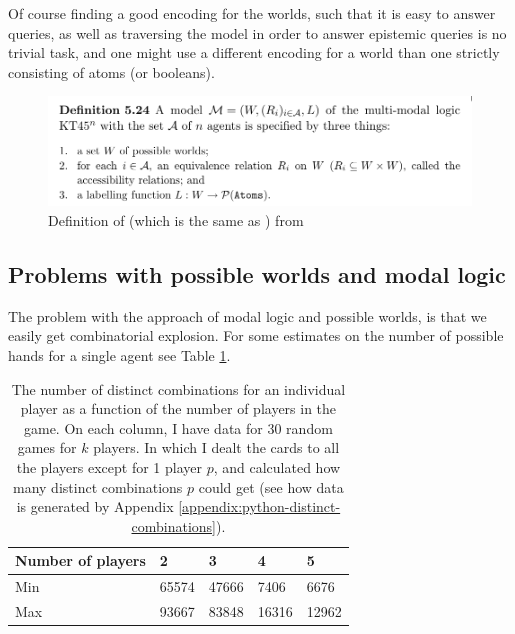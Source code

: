 Of course finding a good encoding for the worlds, such that it is easy to answer queries, as well as traversing the model in order to answer epistemic queries is no trivial task, and one might use a different encoding for a world than one strictly consisting of atoms (or booleans).






\begin{figure}
	\centering
\includegraphics[width=13cm,frame]{images/kt45n-definition.png}
	\caption{Definition of \KTfourfiveN (which is the same as \SfiveN{}) from \cite{HuthAndRyan2004KT45n}}
	\label{fig:kt45n-definition}
\end{figure}




\subsection{Problems with possible worlds and modal logic}
The problem with the approach of modal logic and possible worlds, is that we easily get combinatorial explosion. 
For some estimates on the number of possible hands for a single agent see Table \ref{table:combinations}.

\begin{table}
	\centering
\begin{tabular}{l|llll}
Number of players & 2       & 3       & 4       & 5      \\\hline
Min               & 65574   & 47666   & 7406    & 6676   \\
Max               & 93667   & 83848   & 16316   & 12962 
\end{tabular}
	\caption{The number of distinct combinations for an individual player as a function of the number of players in the game. On each column, I have data for 30 random games for $k$ players. In which I dealt the cards to all the players except for 1 player $p$, and calculated how many distinct combinations $p$ could get (see how data is generated by Appendix \ref{appendix:python-distinct-combinations}).}
	\label{table:combinations}
\end{table}


